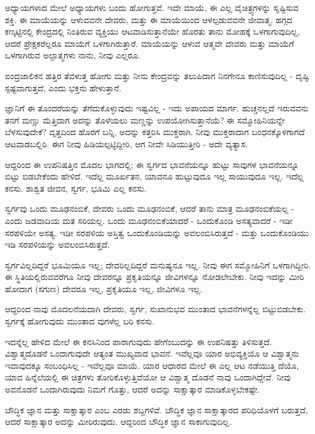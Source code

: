 ಅಧ್ಯಾಯಗಳಾದ ಮೇಲೆ ಅಧ್ಯಾಯಗಳು ಬಂದು ಹೋಗುತ್ತವೆ. ಇದೇ ಮಾಯೆ, ಈ ಎಲ್ಲ ವೈಚಿತ್ರ್ಯಗಳನ್ನು ಸೃಷ್ಟಿಸುವ ಶಕ್ತಿ. ಈ ಮಾಯೆಯನ್ನು ಆಳುವವನೇ ದೇವರು, ಮತ್ತು ಈ ಮಾಯೆಯಿಂದ ಆಳಲ್ಪಡುವವನೇ ಜೀವಾತ್ಮ. ಹಗ್ಗದ ಕಣ್ಕಟ್ಟಿನಲ್ಲಿ ಕೇಂದ್ರದಲ್ಲಿ ನಿಂತಿರುವ ವ್ಯಕ್ತಿಯು ಆಟವಾಡಿಸುತ್ತಾನೆಯೇ ಹೊರತು ತಾನು ಮೋಹಕ್ಕೆ ಒಳಗಾಗುವುದಿಲ್ಲ, ಆದರೆ ಪ್ರೇಕ್ಷಕರೆಲ್ಲರೂ ಮಾಯೆಗೆ ಒಳಗಾಗಿರುತ್ತಾರೆ. ಮಾಯೆಯನ್ನು ಆಳುವ ಆತ್ಮವೇ ದೇವರು ಮತ್ತು ಮಾಯೆಗೆ ಒಳಗಾಗಿರುವ ಅಲ್ಪಾತ್ಮಗಳು ನಾನು, ನೀವು ಎಲ್ಲರೂ.

ಐಂದ್ರಜಾಲಿಕನ ಹತ್ತಿರ ತೆವಳುತ್ತ ಹೋಗು ಮತ್ತು ನೀನು ಕೇಂದ್ರವನ್ನು ತಲುಪಿದಾಗ ನಿನಗೇನೂ ಕಾಣಿಸುವುದಿಲ್ಲ - ದೃಷ್ಟಿ ಸ್ಪಷ್ಟವಾಗುತ್ತದೆ, ಎಂದು ಭಕ್ತನು ಹೇಳುತ್ತಾನೆ.

ಜ್ಞಾನಿಗೆ ಈ ತೊಂದರೆಯನ್ನು ತೆಗೆದುಕೊಳ್ಳುವುದು ಇಷ್ಟವಿಲ್ಲ - ಇದು ಅಪಾಯದ ಮಾರ್ಗ. ಹುಚ್ಚನಲ್ಲದೆ ಇರುವವನು ತನಗೆ ಮಣ್ಣು ಮೆತ್ತಿದಾಗ ಅದನ್ನು ತೊಳೆಯಲು ಮಣ್ಣನ್ನು ಉಪಯೋಗಿಸುತ್ತಾನೆಯೆ? ಈ ಸಮ್ಮೋಹಿನಿಯನ್ನೇ ಬೆಳಸುವುದೇಕೆ? ವೃತ್ತದಿಂದ ಹೊರಗೆ ಬನ್ನಿ, ಅದನ್ನು ಕತ್ತರಿಸಿ ಮುಕ್ತರಾಗಿ. ನೀವು ಮುಕ್ತರಾದಾಗ ಬಂಧನಕ್ಕೊಳಗಾಗದೆ ಆಟವಾಡಬಲ್ಲಿರಿ. ಈಗ ನೀವು ಹಿಡಿಯಲ್ಪಟ್ಟಿದ್ದೀರಿ, ಆಗ ನೀವೇ ಸಿಡಿಯುತ್ತೀರಿ - ಅದೇ ವ್ಯತ್ಯಾಸ.

ಆದ್ದರಿಂದ ಈ ಉಪನಿಷತ್ತಿನ ಮೊದಲ ಭಾಗದಲ್ಲಿ; ಈ ಸ್ವರ್ಗದ ಭಾವನೆಯನ್ನೂ ಹುಟ್ಟು ಸಾವುಗಳ ಭಾವನೆಯನ್ನೂ ಬಿಟ್ಟು ಬಿಡಬೇಕೆಂದು ಹೇಳಿದೆ. ಇದೆಲ್ಲ ಮೂರ್ಖತನ, ಯಾವನೂ ಹುಟ್ಟುವುದೂ ಇಲ್ಲ ಸಾಯುವುದೂ ಇಲ್ಲ. ಇದೆಲ್ಲ ಕನಸು. ಶಾಶ್ವತ ಜೀವನ, ಸ್ವರ್ಗ, ಭೂಮಿ ಎಲ್ಲ ಕನಸು.

ಸ್ವರ್ಗವು ಒಂದು ಮೂಢನಂಬಿಕೆ, ದೇವರು ಒಂದು ಮೂಢನಂಬಿಕೆ, ಆದರೆ ತಾನು ಮಾತ್ರ ಮೂಢನಂಬಿಕೆಯಲ್ಲ - ಎಂದು ಜಡವಾದಿಯ ಮತ ಸರಿಯಲ್ಲ. ಒಂದು ಮೂಢನಂಬಿಕೆಯಾದರೆ - ಒಂದುಕೊಂಡಿ ಅಸತ್ಯವಾದರೆ - ಇಡೀ ಸರಪಳಿಯೇ ಅಸತ್ಯ. ಇಡೀ ಸರಪಳಿಯ ಅಸ್ತಿತ್ವ ಒಂದುಕೊಂಡಿಯನ್ನು ಅವಲಂಬಿಸಿರುತ್ತದೆ - ಮತ್ತು ಒಂದುಕೊಂಡಿಯು ಇಡಿ ಸರಪಳಿಯನ್ನು ಅವಲಂಬಿಸಿರುತ್ತದೆ.

ಸ್ವರ್ಗವಿಲ್ಲದಿದ್ದರೆ ಭೂಮಿಯೂ ಇಲ್ಲ; ದೇವರಿಲ್ಲದಿದ್ದರೆ ಮನುಷ್ಯನೂ ಇಲ್ಲ. ನೀವು ಈಗ ಸಮ್ಮೋಹಿನಿಗೆ ಒಳಗಾಗಿದ್ದೀರಿ. ಈ ಸ್ಥಿತಿಯಲ್ಲಿರುವವರೆಗೂ ನೀವು ದೇವರನ್ನೂ ಪ್ರಕೃತಿಯನ್ನೂ ಜೀವಿಗಳನ್ನೂ ನೋಡಲೇಬೇಕು. ನೀವು ಇದನ್ನು ಮೀರಿ ಹೋದಾಗ (ಸಗುಣ) ದೇವರೂ ಇಲ್ಲ, ಪ್ರಕೃತಿಯೂ ಇಲ್ಲ, ಜೀವಿಗಳೂ ಇಲ್ಲ.

ಆದ್ದರಿಂದ ನಾವು ಮೊದಲನೆಯದಾಗಿ ದೇವರು, ಸ್ವರ್ಗ, ಸುಖಾನುಭವ ಮುಂತಾದ ಭಾವನೆಗಳನ್ನೆಲ್ಲ ಬಿಟ್ಟುಬಿಡಬೇಕು. ಸ್ವರ್ಗಕ್ಕೆ ಹೋಗುವುದು ಮುಂತಾದ ವುಗಳೆಲ್ಲ ಬರಿ ಕನಸು.

ಇದನ್ನೆಲ್ಲ ಹೇಳಿದ ಮೇಲೆ ಈ ಕನಸಿನಿಂದ ಪಾರಾಗುವುದು ಹೇಗೆಂಬುದನ್ನು ಈ ಉಪನಿಷತ್ತು ತಿಳಿಸುತ್ತದೆ. ವಿಶ್ವಾತ್ಮದೊಡನೆ ಒಂದಾಗುವುದೇ ಆತ್ಯಂತ ಮುಖ್ಯವಾದ ಭಾವನೆ. ಇವೆಲ್ಲವೂ ಯಾರ ಅಭಿವ್ಯಕ್ತಿಯೊ ಆ ವಿಶ್ವಾತ್ಮನು ಇವಾವುದಕ್ಕೂ ಸಂಬಂಧಿಸಿಲ್ಲ - ಇವೆಲ್ಲವೂ ಮಾಯೆ. ಯಾರ ಆಧಾರದ ಮೇಲೆ ಈ ಎಲ್ಲ ಆಟ ನಡೆಯುತ್ತಿ ದೆಯೊ, ಯಾವ ಹಿನ್ನೆಲೆಯಲ್ಲಿ ಈ ಚಿತ್ರಗಳು ತೋರಿಕೊಳ್ಳುತ್ತಿವೆಯೋ ಆ ವಿಶ್ವಾತ್ಮ ದೊಡನೆ ನಾವು ಒಂದಾಗಿದ್ದೇವೆ. ನೀವು ಅವನೊಡನೆ ಒಂದಾಗಿರುವುದು ನಿಮಗೆ ಗೊತ್ತು, ಆದರೆ ಅದನ್ನು ಸಾಕ್ಷಾತ್ಕಾರ ಮಾಡಿಕೊಳ್ಳಬೇಕಷ್ಟೇ.

ಬೌದ್ಧಿಕ ಜ್ಞಾನ ಮತ್ತು ಸಾಕ್ಷಾತ್ಕಾರ ಎಂಬ ಎರಡು ಶಬ್ದಗಳಿವೆ. ಬೌದ್ಧಿಕ ಜ್ಞಾನ ಸಾಕ್ಷಾತ್ಕಾರದ ಪರಿಧಿಯೊಳಗೆ ಬರುತ್ತದೆ, ಆದರೆ ಸಾಕ್ಷಾತ್ಕಾರ ಅದನ್ನು ಮೀರಿರುವುದು. ಆದ್ದರಿಂದ ಬೌದ್ಧಿಕ ಜ್ಞಾನ ಸಾಕಾಗುವುದಿಲ್ಲ.

